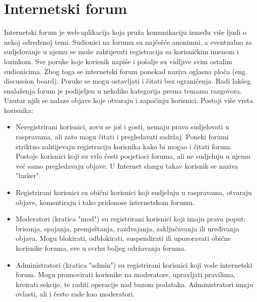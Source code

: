\documentclass{foi}
\begin{document}
\section{Internetski forum}

Internetski forum je web-aplikacija koja pruža komunikaciju između više ljudi o nekoj određenoj temi. Sudionici na forumu su najčešće anonimni, a eventualno za sudjelovanje u njemu se može zahtijevati registracija sa korisničkim imenom i lozinkom.  Sve poruke koje korisnik napiše i pošalje su vidljive svim ostalim sudionicima. \cite{definitionInternetForum} Zbog toga se internetski forum ponekad naziva oglasna ploča (eng. discussion board). Poruke se mogu ostavljati i čitati bez ograničenja. Radi lakšeg snalaženja forum je podijeljen u nekoliko kategorija prema temama razgovora. Unutar njih se nalaze objave koje otvaraju i započinju korisnici. Postoji više vrsta korisnika:

\begin{itemize}
\item Neregistrirani korisnici, zovu se još i gosti, nemaju pravo sudjelovati u raspravama, ali zato mogu čitati i pregledavati sadržaj. Poneki forumi striktno zahtijevaju registraciju korisnika kako bi mogao i čitati forum. Postoje korisnici koji su vrlo česti posjetioci foruma, ali ne sudjeluju u njemu već samo pregledavaju objave. U Internet slangu takav korisnik se naziva "lurker".\cite{lurker}
\item Registrirani korisnici su obični korisnici koji sudjeluju u raspravama, otvaraju objave, komentiraju i tako pridonose internetskom forumu.
\item Moderatori (kratica "mod") su registrirani korisnici koji imaju prava poput: brisanja, spajanja, premještanja, razdvajanja, zaključavanja ili uređivanja objava. Mogu blokirati, odblokirati, suspendirati ili upozoravati obične korisnike foruma, sve u svrhu boljeg održavanja foruma.
\item Administratori (kratica "admin") su registrirani korisnici koji vode internetski forum. Mogu promovirati korisnike na moderatore, upravljati pravilima, kreirati sekcije, te raditi operacije nad bazom podataka. Administratori imaju ovlasti, ali i često rade kao moderatori.\cite{adminvsmoderator}
\end{itemize}
\end{document}
